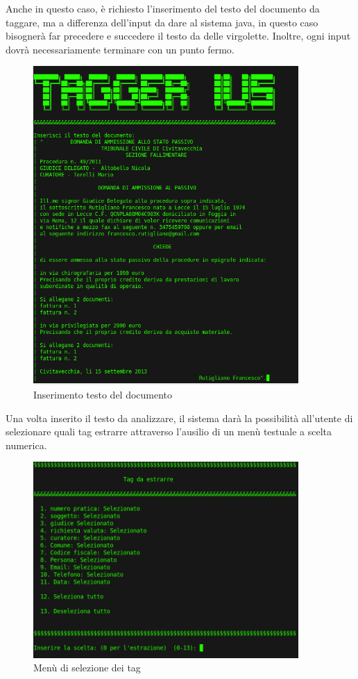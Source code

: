 Anche in questo caso, è richiesto l'inserimento del testo del documento da taggare, ma a differenza dell'input da dare al sistema java, in questo caso bisognerà far precedere e succedere il testo da delle virgolette.
Inoltre, ogni input dovrà necessariamente terminare con un punto fermo.

\begin{figure}[H]
	\centering
	\includegraphics[width=0.9\textwidth]{img/interfaces/CLI-document.png}
	\caption[Schermata CLI document]{Inserimento testo del documento}
	\label{CLI-doc}
\end{figure}

Una volta inserito il testo da analizzare, il sistema darà la possibilità all'utente di selezionare quali tag estrarre attraverso l'ausilio di un menù testuale a scelta numerica.

\begin{figure}[H]
	\centering
	\includegraphics[width=0.9\textwidth]{img/interfaces/CLI-tagSelect.png}
	\caption[Schermata CLI tag select]{Menù di selezione dei tag}
	\label{CLI-tagSelect}
\end{figure}

